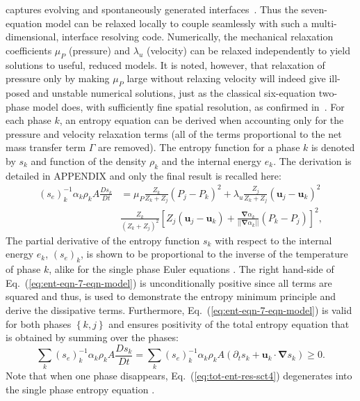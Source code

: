 \documentclass[preprint,10pt]{elsarticle}
\newcommand{\grad}{\mbold{\nabla}}
\newcommand{\mbold}[1]{\boldsymbol#1}
\newcommand{\eqt}[1]{Eq.~(\ref{#1})}                     %
\begin{document}
captures evolving and spontaneously generated
interfaces~\cite{Saurel_2009}. Thus the seven-equation model
can be relaxed locally to couple seamlessly with such a
multi-dimensional, interface resolving code. Numerically, the mechanical relaxation coefficients $\mu_P$
(pressure) and $\lambda_u$ (velocity) can be relaxed independently to
yield solutions to useful, reduced models.  It
is noted, however, that relaxation of pressure only by making $\mu_P$
large without relaxing velocity will indeed give ill-posed and
unstable numerical solutions, just as the classical six-equation
two-phase model does, with sufficiently fine spatial resolution, as
confirmed in~\cite{SEM,Herrard_2005}. For each phase $k$, an entropy equation can be derived when accounting only for the pressure and velocity relaxation terms (all of the terms proportional to the net mass transfer term $\Gamma$ are removed). The entropy function for a phase $k$ is denoted by $s_k$ and function of the density $\rho_k$ and the internal energy $e_k$. The derivation is detailed in APPENDIX and only the final result is recalled here:
%
\begin{align}\label{eq:ent-eqn-7-eqn-model}
(s_{e})_k^{-1} \alpha_k \rho_k A \frac{Ds_k}{Dt} &= \mu_P \frac{Z_k}{Z_k+Z_j} (P_j - P_k)^2 + \lambda_u \frac{Z_j}{Z_k+Z_j} (\mbold u_j -\mbold  u_k)^2 \nonumber
\\
& \frac{Z_k}{\left( Z_k+Z_j \right)^2} \left[ Z_j (\mbold u_j-\mbold u_k)+\frac{\grad \alpha_k}{|| \grad \alpha_k ||}(P_k-P_j)\right]^2,
\end{align}
The partial derivative of the entropy function $s_k$ with respect to the internal energy $e_k$, $(s_e)_k$, is shown to be proportional to the inverse of the temperature of phase $k$, alike for the single phase Euler equations \cite{jlg, Marco_dissertation}. The right hand-side of \eqt{eq:ent-eqn-7-eqn-model} is unconditionally positive since all terms are squared and thus, is used to demonstrate the entropy minimum principle and derive the dissipative terms. Furthermore, \eqt{eq:ent-eqn-7-eqn-model} is valid for both phases $\left\{k, j\right\}$ and ensures positivity of the total entropy equation that is obtained by summing over the phases:
%
\begin{equation}\label{eq:tot-ent-res-sct4}
\sum_k (s_{e})_k^{-1} \alpha_k \rho_k A \frac{Ds_k}{Dt} = \sum_k (s_{e})_k^{-1} \alpha_k \rho_k A \left( \partial_t s_k + \mbold u_k \cdot \grad s_k \right) \geq 0 \nonumber .
\end{equation}
%
Note that when one phase disappears, \eqt{eq:tot-ent-res-sct4} degenerates into the single phase entropy equation \cite{SEM, Marco_dissertation}.
\end{document}
